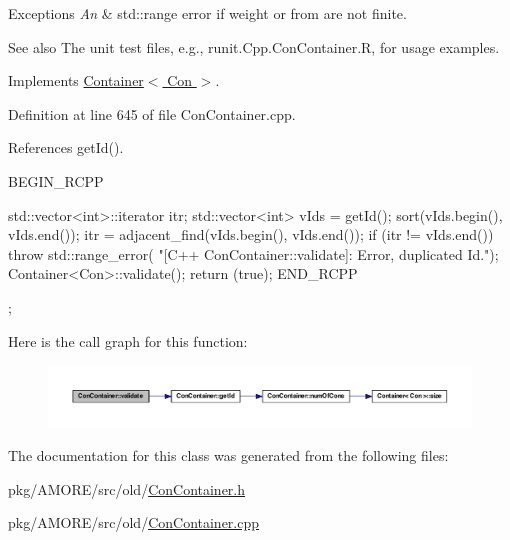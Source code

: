 \begin{DoxyExceptions}{Exceptions}
{\em An} & std::range error if weight or from are not finite.\\
\hline
\end{DoxyExceptions}
\begin{DoxySeeAlso}{See also}
The unit test files, e.g., runit.Cpp.ConContainer.R, for usage examples. 
\end{DoxySeeAlso}


Implements \hyperlink{class_container_acfdc5456a2fc854d1830a8a351567928}{Container$<$ Con $>$}.



Definition at line 645 of file ConContainer.cpp.



References getId().


\begin{DoxyCode}
{
  BEGIN_RCPP

  std::vector<int>::iterator itr;
  std::vector<int> vIds = getId();
  sort(vIds.begin(), vIds.end());
  itr = adjacent_find(vIds.begin(), vIds.end());
  if (itr != vIds.end())
    throw std::range_error(
        "[C++ ConContainer::validate]: Error, duplicated Id.");
  Container<Con>::validate();
  return (true);
END_RCPP};
\end{DoxyCode}


Here is the call graph for this function:\nopagebreak
\begin{figure}[H]
\begin{center}
\leavevmode
\includegraphics[width=400pt]{class_con_container_aac12a3d3604db9ff715503816109470c_cgraph}
\end{center}
\end{figure}




The documentation for this class was generated from the following files:\begin{DoxyCompactItemize}
\item 
pkg/AMORE/src/old/\hyperlink{_con_container_8h}{ConContainer.h}\item 
pkg/AMORE/src/old/\hyperlink{_con_container_8cpp}{ConContainer.cpp}\end{DoxyCompactItemize}
